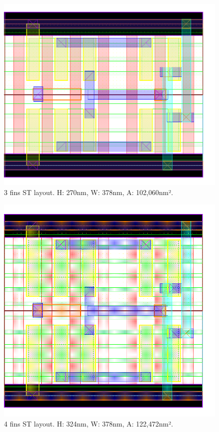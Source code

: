 \documentclass[diss,pgmicro,english]{iiufrgs}
\begin{document}
\begin{figure}[]
\centering
\includegraphics[width=\textwidth,height=\textheight,keepaspectratio]{ST3F.png}
\caption{3 fins ST layout. H: 270nm, W: 378nm, A: 102,060nm².}
\label{fig:ST3F}
\end{figure}

\begin{figure}[]
\centering
\includegraphics[width=\textwidth,height=\textheight,keepaspectratio]{ST4F.png}
\caption{4 fins ST layout.  H: 324nm, W: 378nm, A: 122,472nm².}
\label{fig:ST4F}
\end{figure}
\end{document}
